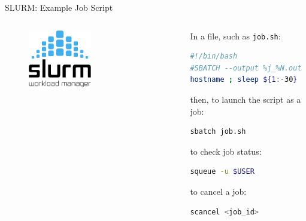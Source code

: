 \begin{frame}[fragile]{SLURM: Example Job Script}
    \begin{columns}
        \begin{column}{0.4\textwidth}
            \begin{figure}
                \centering
                \includegraphics[width=0.5\textwidth]{images/slurm_logo.png}
            \end{figure}
        \end{column}
        \begin{column}{0.6\textwidth}
            In a file, such as \texttt{job.sh}:
            \begin{lstlisting}[language=bash]
#!/bin/bash
#SBATCH --output %j_%N.out
hostname ; sleep ${1:-30}
            \end{lstlisting}
            then, to launch the script as a job:
            \begin{lstlisting}[language=bash]
sbatch job.sh
            \end{lstlisting}
            to check job status:
            \begin{lstlisting}[language=bash]
squeue -u $USER 
            \end{lstlisting}
            to cancel a job:
            \begin{lstlisting}[language=bash]
scancel <job_id>
            \end{lstlisting}
        \end{column}
    \end{columns}
\end{frame}

